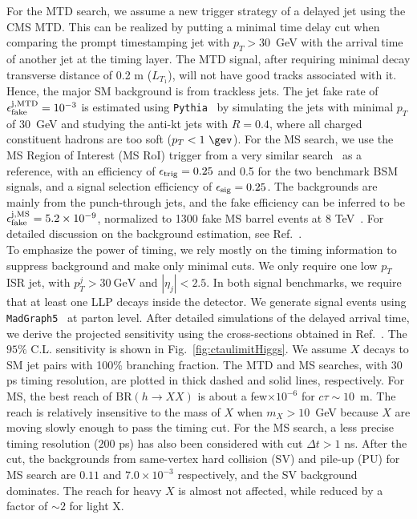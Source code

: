For the MTD search, we assume a new trigger strategy of a delayed jet using the CMS MTD.
This can be realized by putting a minimal time delay cut when comparing the prompt timestamping jet with $p_T > 30$~GeV with the arrival time of another jet at the timing layer. 
The MTD signal, after requiring minimal decay transverse distance of 0.2 m ($L_{T_1}$), will not 
have good tracks associated with it. Hence, the major SM background is from trackless jets.
The jet fake rate of $\epsilon_{\rm fake}^{\rm j, MTD} = 10^{-3}$ is estimated
using {\tt Pythia}~\cite{Sjostrand:2007gs} by simulating the jets with minimal $p_T$ of 30~GeV and studying the anti-kt jets with $R=0.4$, where all charged constituent hadrons are too soft ($p_T<1~\gev$). 
For the MS search, we use the MS Region 
of Interest (MS RoI) trigger from a very similar search~\cite{Aaboud:2017iio} as a reference, with an efficiency 
of $\epsilon_{\rm trig}=0.25$ and 0.5 for the two benchmark BSM signals, and a signal selection efficiency of 
$\epsilon_{\rm sig}=0.25$. The backgrounds are mainly from the punch-through jets, and the  fake efficiency can be inferred 
to be $\epsilon_{\rm fake}^{\rm j, MS} = 5.2 \times 10^{-9}$, normalized to 1300 fake MS barrel events at 8 TeV~\cite{Aaboud:2017iio}.
For detailed discussion on the background estimation, see Ref.~\cite{Liu:2018wte}.
\\

To emphasize the power of timing, we rely mostly on the timing information to suppress background and make only 
minimal cuts. We only require one low $p_T$ ISR jet, with $p_T^j > 30~\text{GeV}$ and $|\eta_j| < 2.5$.
In both signal benchmarks, we require that at least one LLP decays inside the detector. We generate signal events using {\tt MadGraph5}~\cite{Alwall:2014hca} at parton level. 
After detailed simulations of the delayed arrival time, we derive the projected sensitivity using the 
cross-sections obtained in Ref.~\cite{Greiner:2015jha}. The $95\%$ C.L. sensitivity is shown in Fig.~\ref{fig:ctaulimitHiggs}. 
We assume $X$ decays to SM jet pairs with 100\% branching fraction.
The MTD and MS searches, with $30$ ps timing resolution, are plotted in thick dashed and solid lines, respectively. 
For MS, the best reach of $\text{BR}(h\to XX)$ is about a few$\times 10^{-6}$ for $c \tau \sim 10$~m. 
The reach is relatively insensitive to the mass of $X$ when $m_X> 10$~GeV because $X$ are moving slowly enough
to pass the timing cut. 
For the MS search, a less precise timing resolution 
($200$ ps) has also been considered with cut $\Delta t > 1$ ns. After the cut, the backgrounds from same-vertex hard collision (SV) and pile-up (PU) for MS search are $0.11$ and $7.0 \times 10^{-3}$ respectively, and the SV background dominates.  
The reach for heavy $X$ is almost not affected, 
while reduced by a factor of $\sim 2$ for light X.

